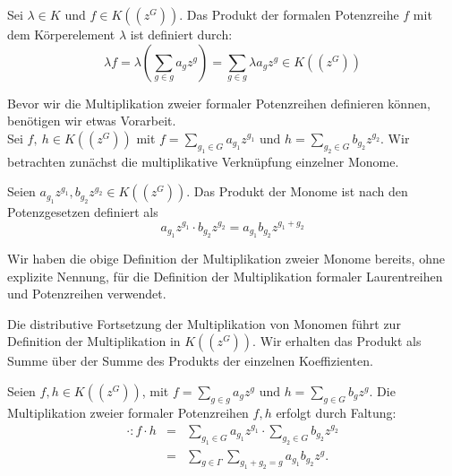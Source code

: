 %
%
%
\begin{defn}\label{MultiplikationMitKörperelement}
Sei $\lambda \in K$ und $f \in K\left(\left(z^{G}\right)\right)$. Das Produkt der formalen Potenzreihe $f$ mit dem Körperelement $\lambda$ ist definiert durch: \[\lambda f = \lambda \left(\sum_{g \in g}^{} a_g z^g\right) = \sum_{g \in g}^{} \lambda a_g z^g \in K\left(\left(z^{G}\right)\right)\]
\end{defn}
  
Bevor wir die Multiplikation zweier formaler Potenzreihen definieren können, benötigen wir etwas Vorarbeit.\\
Sei $f,~ h \in K\left(\left(z^{G}\right)\right)$ mit $ f = \sum_{g_1 \in G}^{} a_{g_1} z^{g_1} \text{ und } h = \sum_{g_2 \in G}^{} b_{g_2} z^{g_2} $. 
%
%
%
%
%
%
Wir betrachten zunächst die multiplikative Verknüpfung einzelner Monome. 
\begin{defn}
Seien $a_{g_1} z^{g_1}, b_{g_2} z^{g_2} \in K\left(\left(z^G\right)\right)$. Das Produkt der Monome ist nach den Potenzgesetzen definiert als 
\[a_{g_1} z^{g_1} \cdot b_{g_2}z^{g_2} = a_{g_1} b_{g_2} z^{g_1 + g_2}\]
\end{defn}
%
%
\begin{bem}
Wir haben die obige Definition der Multiplikation zweier Monome bereits, ohne explizite Nennung, für die Definition der Multiplikation formaler Laurentreihen und Potenzreihen verwendet. 
\end{bem}
%
%
%
%
%
%
%
Die distributive Fortsetzung der Multiplikation von Monomen führt zur Definition der Multiplikation in $K\left(\left(z^{G}\right)\right)$. Wir erhalten das Produkt als Summe über der Summe des Produkts der einzelnen Koeffizienten.
%
%
%
\begin{defn}\label{MultiplikationformalePotenzreihen}
Seien $f, h \in K\left(\left(z^G\right)\right)$, mit $f = \sum_{g \in g}^{} a_g z^g \text{ und } h = \sum_{g \in G}^{} b_g z^g$. Die Multiplikation zweier formaler Potenzreihen $f, h$ erfolgt durch Faltung: 
\begin{eqnarray*}\label{eq: multPotenzreihenkoerper}  
\cdot\colon f\cdot h &=& \sum_{g_1 \in G}^{} a_{g_1} z^{g_1} \cdot \sum_{g_2 \in G}^{} b_{g_2} z^{g_2} \\
&=& \sum_{g \in \Gamma}^{}\sum_{g_1 + g_2 = g}^{}a_{g_1} b_{g_2}z^g.  
\end{eqnarray*} 
\end{defn}
